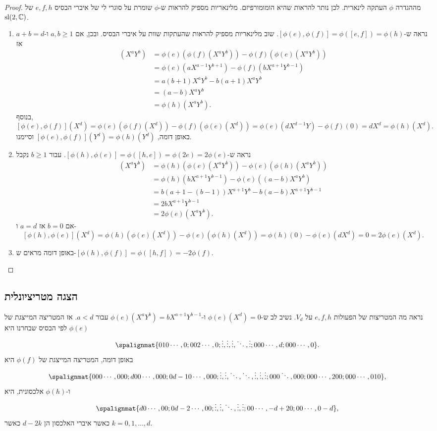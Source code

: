 \documentclass{report}
\theoremstyle{break}
\theoremstyle{MyNonumberbreak}
\newtheorem{proof}{הוכחה}
\begin{document}
\begin{proof}
	מההגדרה $\phi$ העתקה לינארית. לכן נותר להראות שהיא הומומורפיזם. מלינאריות מספיק להראות ש-$\phi$ שומרת על סוגרי לי של איברי הבסיס $e, f, h$ של $\operatorname{sl}(2, \operatorname{\mathbb{C}})$.
	\begin{enumerate}
		\item 
		נראה ש-$[\phi(e), \phi(f)] = \phi([e, f]) = \phi(h)$. שוב מלינאריות מספיק להראות שהעתקות שוות על איברי הבסיס. ובכן, אם $a, b \ge 1$ ו-$a + b = d$ אז
		\begin{align*}
			[\phi(e), \phi(f)](X^aY^b) &= \phi(e)(\phi(f)(X^aY^b)) - \phi(f)(\phi(e)(X^aY^b)) \\
				&= \phi(e)(aX^{a-1}Y^{b+1}) - \phi(f)(bX^{a+1}Y^{b-1}) \\
				&= a(b+1)X^aY^b - b(a+1)X^aY^b \\
				&= (a - b)X^aY^b \\
				&= \phi(h)(X^aY^b).
		\end{align*}
		בנוסף,
		\[ [\phi(e), \phi(f)](X^d) = \phi(e)(\phi(f)(X^d)) - \phi(f)(\phi(e)(X^d)) = \phi(e)(dX^{d-1}Y) - \phi(f)(0) = dX^d = \phi(h)(X^d). \]
		באופן דומה, $[\phi(e), \phi(f)](Y^d) = \phi(h)(Y^d)$ וסיימנו.
		\item
		נראה ש-$[\phi(h), \phi(e)] = \phi([h, e]) = \phi(2e) = 2\phi(e)$. עבור $b \ge 1$ נקבל
		\begin{align*}
			[\phi(h), \phi(e)](X^aY^b) &= \phi(h)(\phi(e)(X^aY^b)) - \phi(e)(\phi(h)(X^aY^b)) \\
				&= \phi(h)(bX^{a+1}Y^{b-1}) - \phi(e)((a - b)X^aY^b) \\
				&= b(a + 1 - (b - 1))X^{a+1}Y^b - b(a - b)X^{a+1}Y^{b-1} \\
				&= 2bX^{a+1}Y^{b-1} \\
				&= 2\phi(e)(X^aY^b).
		\end{align*}
		אם $b = 0$ אז $a = d$ ו-
		\[ [\phi(h), \phi(e)](X^d) = \phi(h)(\phi(e)(X^d)) - \phi(e)(\phi(h)(X^d)) = \phi(h)(0) - \phi(e)(dX^d) = 0 = 2\phi(e)(X^d). \]
		\item
		באופן דומה מראים ש-$[\phi(h), \phi(f)] = \phi([h, f]) = -2\phi(f)$.
	\end{enumerate}
\end{proof}

\subsection{הצגה מטריציונלית}
נראה מה המטריצות של הפעולות $e, f, h$ על $V_d$. נשיב לב ש-$\phi(e)(X^d) = 0$ ו-$\phi(e)(X^aY^b) = bX^{a+1}Y^{b-1}$ עבור $a < d$. אז המטריצה המייצגת של $\phi(e)$ לפי הבסיס שבחרנו היא
\[ \spalignmat{0 1 0 \cdots, 0 ; 0 0 2 \cdots, 0 ; \vdots, \vdots, \vdots, \ddots, \vdots ; 0 0 0 \cdots, d ; 0 0 0 \cdots, 0}.  \]
באופן דומה, המטריצה המייצגת של $\phi(f)$ היא
\[ \spalignmat{0 0 0 \cdots, 0 0 0 ; d 0 0 \cdots, 0 0 0 ; 0 d-1 0 \cdots, 0 0 0 ; \vdots, \vdots, \ddots, \ddots, \vdots, \vdots, \vdots ; 0 0 0 \ddots, 0 0 0 ; 0 0 0 \cdots, 2 0 0 ; 0 0 0 \cdots, 0 1 0}, \]
ו-$\phi(h)$ אלכסונית, היא
\[ \spalignmat{d 0 \cdots, 0 0 ; 0 d-2 \cdots, 0 0 ; \vdots, \vdots, \ddots, \vdots, \vdots ; 0 0 \cdots, -d+2 0 ; 0 0 \cdots, 0 -d}, \]
כאשר איברי האלכסון הן $d-2k$ כאשר $k = 0, 1, \ldots, d$.
\end{document}
